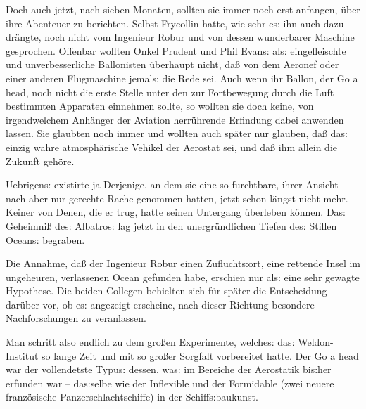 \documentclass[oneside,12pt]{book}
\newenvironment{antiqua}{\normalfont}{}
\newcommand{\s}{s:}
\begin{document}
Doch auch jetzt, nach sieben Monaten, sollten sie immer noch erst
anfangen, \"uber ihre Abenteuer zu berichten. Selbst Frycollin hatte,
wie sehr e{\s} ihn auch dazu dr\"angte, noch nicht vom Ingenieur
Robur und von dessen wunderbarer Maschine gesprochen. Offenbar
wollten Onkel Prudent und Phil Evan{\s} al{\s} eingefleischte und
unverbesserliche Ballonisten \"uberhaupt nicht, da{\ss} von dem
Aeronef oder einer anderen Flugmaschine jemal{\s} die Rede sei. Auch
wenn ihr Ballon, der \begin{antiqua}Go a head\end{antiqua}, noch
nicht die erste Stelle unter den zur Fortbewegung durch die Luft
bestimmten Apparaten einnehmen sollte, so wollten sie doch keine, von
irgendwelchem Anh\"anger der Aviation herr\"uhrende Erfindung dabei
anwenden lassen. Sie glaubten noch immer und wollten auch sp\"ater
nur glauben, da{\ss} da{\s} einzig wahre atmosph\"arische Vehikel der
Aerostat sei, und da{\ss} ihm allein die Zukunft geh\"ore.

Uebrigen{\s} existirte ja Derjenige, an dem sie eine so furchtbare,
ihrer Ansicht nach aber nur gerechte Rache genommen hatten, jetzt
schon l\"angst nicht mehr. Keiner von Denen, die er trug, hatte
seinen Untergang \"uberleben k\"onnen. Da{\s} Geheimni{\ss} de{\s}
{\glqq}Albatro{\s}{\grqq} lag jetzt in den unergr\"undlichen Tiefen
de{\s} Stillen Ocean{\s} begraben.

Die Annahme, da{\ss} der Ingenieur Robur einen Zuflucht{\s}ort, eine
rettende Insel im ungeheuren, verlassenen Ocean gefunden habe,
erschien nur al{\s} eine sehr gewagte Hypothese. Die beiden Collegen
behielten sich f\"ur sp\"ater die Entscheidung dar\"uber vor, ob
e{\s} angezeigt erscheine, nach dieser Richtung besondere
Nachforschungen zu veranlassen.

Man schritt also endlich zu dem gro{\ss}en Experimente, welche{\s}
da{\s} Weldon-Institut so lange Zeit und mit so gro{\ss}er Sorgfalt
vorbereitet hatte. Der \begin{antiqua}Go a head\end{antiqua} war der
vollendetste Typu{\s} dessen, wa{\s} im Bereiche der Aerostatik
bi{\s}her erfunden war -- da{\s}selbe wie der
\begin{antiqua}{\glqq}Inflexible{\grqq}\end{antiqua} und der
\begin{antiqua}{\glqq}Formidable{\grqq}\end{antiqua} (zwei neuere
franz\"osische Panzerschlachtschiffe) in der Schiff{\s}baukunst.
\end{document}
